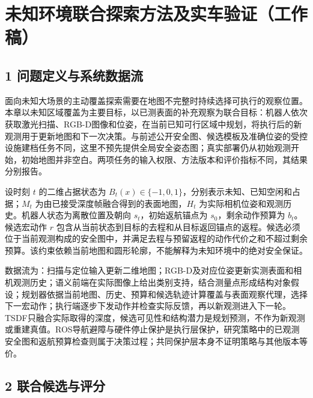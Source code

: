 \documentclass[]{article}
\date{}
\begin{document}
\hypertarget{ux672aux77e5ux73afux5883ux8054ux5408ux63a2ux7d22ux65b9ux6cd5ux53caux5b9eux8f66ux9a8cux8bc1ux5de5ux4f5cux7a3f}{%
\section{未知环境联合探索方法及实车验证（工作稿）}\label{ux672aux77e5ux73afux5883ux8054ux5408ux63a2ux7d22ux65b9ux6cd5ux53caux5b9eux8f66ux9a8cux8bc1ux5de5ux4f5cux7a3f}}

\hypertarget{ux95eeux9898ux5b9aux4e49ux4e0eux7cfbux7edfux6570ux636eux6d41}{%
\subsection{1
问题定义与系统数据流}\label{ux95eeux9898ux5b9aux4e49ux4e0eux7cfbux7edfux6570ux636eux6d41}}

面向未知大场景的主动覆盖探索需要在地图不完整时持续选择可执行的观察位置。本章以未知区域覆盖为主要目标，以已测表面的补充观察为联合目标：机器人依次获取激光扫描、RGB-D图像和位姿，在当前已知可行区域中规划，将执行后的新观测用于更新地图和下一次决策。与前述公开安全图、候选模板及准确位姿的受控设施建档任务不同，这里不预先提供全局安全姿态图；真实部署仍从初始观测开始，初始地图并非空白。两项任务的输入权限、方法版本和评价指标不同，其结果分别报告。

设时刻 \(t\) 的二维占据状态为
\(B_t(x)\in\{-1,0,1\}\)，分别表示未知、已知空闲和占据；\(M_t\)
为由已接受深度帧融合得到的表面地图，\(H_t\)
为实际相机位姿和观测历史。机器人状态为离散位置及朝向
\(s_t\)，初始返航锚点为 \(s_0\)，剩余动作预算为 \(b_t\)。候选宏动作
\(r\)
包含从当前状态到目标的去程和从目标返回锚点的返程。候选必须位于当前观测构成的安全图中，并满足去程与预留返程的动作代价之和不超过剩余预算。该约束依赖当前地图和圆形轮廓，不能解释为未知环境中的绝对安全保证。

数据流为：扫描与定位输入更新二维地图；RGB-D及对应位姿更新实测表面和相机观测历史；语义前端在实际图像上给出类别支持，结合测量点形成结构对象假设；规划器依据当前地图、历史、预算和候选轨迹计算覆盖与表面观察代理，选择下一宏动作；执行端逐步下发动作并检查实际反馈，再以新观测进入下一轮。TSDF只融合实际取得的深度，候选可见性和结构潜力是规划预测，不作为新观测或重建真值。ROS导航避障与硬件停止保护是执行层保护，研究策略中的已观测安全图和返航预算检查则属于决策过程；共同保护层本身不证明策略与其他版本等价。

\hypertarget{ux8054ux5408ux5019ux9009ux4e0eux8bc4ux5206}{%
\subsection{2
联合候选与评分}\label{ux8054ux5408ux5019ux9009ux4e0eux8bc4ux5206}}
\end{document}
